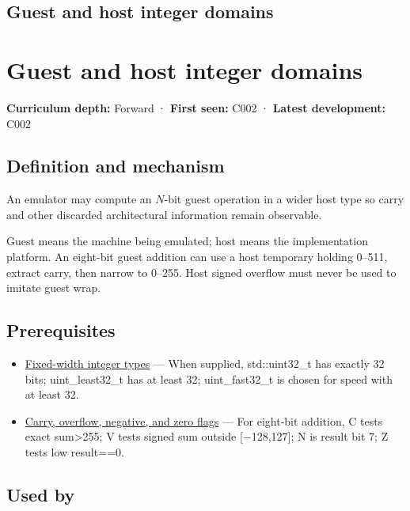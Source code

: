 \hypertarget{appendix-33e7a011b684}{}
\section*{Guest and host integer domains}
\chapter{Guest and host integer domains}\label{appendix-33e7a011b684-guest-and-host-integer-domains}

\textbf{Curriculum depth:} Forward · \textbf{First seen:} C002 · \textbf{Latest development:} C002

\section{Definition and mechanism}\label{appendix-33e7a011b684-definition-and-mechanism}

An emulator may compute an \(N\)-bit guest operation in a wider host type so carry and other discarded architectural information remain observable.

Guest means the machine being emulated; host means the implementation platform. An eight-bit guest addition can use a host temporary holding 0--511, extract carry, then narrow to 0--255. Host signed overflow must never be used to imitate guest wrap.

\section{Prerequisites}\label{appendix-33e7a011b684-prerequisites}

\begin{itemize}
\tightlist
\item
  \hyperref[appendix-cc04044b5782]{Fixed-width integer types} --- When supplied, std::uint32\_t has exactly 32 bits; uint\_least32\_t has at least 32; uint\_fast32\_t is chosen for speed with at least 32.
\item
  \hyperref[appendix-8d687c9c08ab]{Carry, overflow, negative, and zero flags} --- For eight-bit addition, C tests exact sum\textgreater255; V tests signed sum outside {[}−128,127{]}; N is result bit 7; Z tests low result==0.
\end{itemize}

\section{Used by}\label{appendix-33e7a011b684-used-by}

